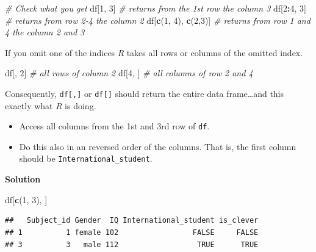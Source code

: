 \documentclass[
]{scrartcl}
\makeatletter
\newenvironment{Shaded}{\begin{snugshade}}{\end{snugshade}}
\newcommand{\CommentTok}[1]{\textcolor[rgb]{0.56,0.35,0.01}{\textit{#1}}}
\newcommand{\DecValTok}[1]{\textcolor[rgb]{0.00,0.00,0.81}{#1}}
\newcommand{\FunctionTok}[1]{\textcolor[rgb]{0.13,0.29,0.53}{\textbf{#1}}}
\newcommand{\NormalTok}[1]{#1}
\newcommand{\SpecialCharTok}[1]{\textcolor[rgb]{0.81,0.36,0.00}{\textbf{#1}}}
\providecommand{\tightlist}{%
  \setlength{\itemsep}{0pt}\setlength{\parskip}{0pt}}
\newenvironment{kframe}{%
\medskip{}
\setlength{\fboxsep}{.8em}
 \def\at@end@of@kframe{}%
 \ifinner\ifhmode%
  \def\at@end@of@kframe{\end{minipage}}%
  \begin{minipage}{\columnwidth}%
 \fi\fi%
 \def\FrameCommand##1{\hskip\@totalleftmargin \hskip-\fboxsep
 \colorbox{shadecolor}{##1}\hskip-\fboxsep
     \hskip-\linewidth \hskip-\@totalleftmargin \hskip\columnwidth}%
 \MakeFramed {\advance\hsize-\width
   \@totalleftmargin\z@ \linewidth\hsize
   \@setminipage}}%
 {\par\unskip\endMakeFramed%
 \at@end@of@kframe}
\newenvironment{rmdblock}[1]
  {
  \begin{itemize}
  \renewcommand{\labelitemi}{
    \raisebox{-.7\height}[0pt][0pt]{
      {\setkeys{Gin}{width=3em,keepaspectratio}\texttt{[image: images/\#1]}}
    }
  }
  \setlength{\fboxsep}{1em}
  \begin{kframe}
  \item
  }
  {
  \end{kframe}
  \end{itemize}
  }
\newenvironment{myexercise}
    {\begin{rmdblock}{exercise_green}}
    {\end{rmdblock}}
\newenvironment{webexsolution}[1]
    {\par\tiny\textbf{#1}}
    {\par}
\newcommand{\webexhide}[1]{\begin{webexsolution}{#1}}
\makeatother
\begin{document}
\begin{Shaded}
\begin{Highlighting}[]
\CommentTok{\# Check what you get}
\NormalTok{df[}\DecValTok{1}\NormalTok{, }\DecValTok{3}\NormalTok{]             }\CommentTok{\# returns from the 1st row the column 3}
\NormalTok{df[}\DecValTok{2}\SpecialCharTok{:}\DecValTok{4}\NormalTok{, }\DecValTok{3}\NormalTok{]           }\CommentTok{\# returns from row 2{-}4 the column 2}
\NormalTok{df[}\FunctionTok{c}\NormalTok{(}\DecValTok{1}\NormalTok{, }\DecValTok{4}\NormalTok{), }\FunctionTok{c}\NormalTok{(}\DecValTok{2}\NormalTok{,}\DecValTok{3}\NormalTok{)]  }\CommentTok{\# returns from row 1 and 4 the column 2 and 3}
\end{Highlighting}
\end{Shaded}

If you omit one of the indices \emph{R} takes all rows or columns of the omitted index.

\begin{Shaded}
\begin{Highlighting}[]
\NormalTok{df[, }\DecValTok{2}\NormalTok{]    }\CommentTok{\# all rows of column 2}
\NormalTok{df[}\DecValTok{4}\NormalTok{, ]    }\CommentTok{\# all columns of row 2 and 4}
\end{Highlighting}
\end{Shaded}

Consequently, \texttt{df{[},{]}} or \texttt{df{[}{]}} should return the entire data frame\ldots and this exactly what \emph{R} is doing.

\begin{myexercise}
\begin{itemize}
\tightlist
\item
  Access all columns from the 1st and 3rd row of \texttt{df}.
\item
  Do this also in an reversed order of the columns. That is, the first
  column should be \texttt{International\_student}.
\end{itemize}
\end{myexercise}
\webexhide{Solution}

\begin{Shaded}
\begin{Highlighting}[]
\NormalTok{df[}\FunctionTok{c}\NormalTok{(}\DecValTok{1}\NormalTok{, }\DecValTok{3}\NormalTok{), ]}
\end{Highlighting}
\end{Shaded}

\begin{verbatim}
##   Subject_id Gender  IQ International_student is_clever
## 1          1 female 102                 FALSE     FALSE
## 3          3   male 112                  TRUE      TRUE
\end{verbatim}
\end{document}

